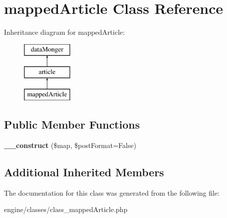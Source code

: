 \hypertarget{classmappedArticle}{\section{mapped\-Article Class Reference}
\label{classmappedArticle}
}
Inheritance diagram for mapped\-Article\-:\begin{figure}[H]
\begin{center}
\leavevmode
\includegraphics[height=3.000000cm]{classmappedArticle}
\end{center}
\end{figure}
\subsection*{Public Member Functions}
\begin{DoxyCompactItemize}
\item 
\hypertarget{classmappedArticle_a1eba5bad9e5365838d33070dda0cddd3}{{\bfseries \-\_\-\-\_\-construct} (\$map, \$post\-Format=False)}\label{classmappedArticle_a1eba5bad9e5365838d33070dda0cddd3}

\end{DoxyCompactItemize}
\subsection*{Additional Inherited Members}


The documentation for this class was generated from the following file\-:\begin{DoxyCompactItemize}
\item 
engine/classes/class\-\_\-mapped\-Article.\-php\end{DoxyCompactItemize}
